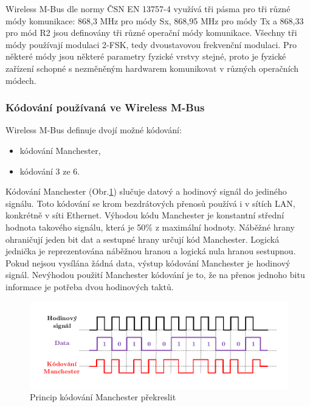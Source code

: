 Wireless M-Bus dle normy ČSN EN 13757-4 \cite{Norma4} využívá tři pásma pro tři různé módy komunikace: 868,3 MHz pro módy Sx, 868,95 MHz pro módy Tx a 868,33 pro mód R2 jsou definovány tři různé operační módy komunikace. Všechny tři módy používají modulaci 2-FSK, tedy dvoustavovou frekvenční modulaci. Pro některé módy jsou některé parametry fyzické vrstvy stejné, proto je fyzické zařízení schopné s nezměněným hardwarem komunikovat v různých operačních módech.


\subsubsection{Kódování používaná ve Wireless M-Bus}
Wireless M-Bus definuje dvojí možné kódování: 
\begin{itemize}
	\item kódování Manchester,
	\item kódování 3 ze 6. 
\end{itemize}

Kódování Manchester (Obr.\ref{ObrazekManechester}) slučuje datový a hodinový signál do jediného signálu. Toto kódování se krom bezdrátových přenosů používá i v sítích LAN, konkrétně v síti Ethernet. Výhodou kódu Manchester je konstantní střední hodnota takového signálu, která je 50\% z maximální hodnoty. Náběžné hrany ohraničují jeden bit dat a sestupné hrany určují kód Manchester. Logická jednička je reprezentována náběžnou hranou a logická nula hranou sestupnou. Pokud nejsou vysílána žádná data, výstup kódování Manchester je hodinový signál. Nevýhodou použití Manchester kódování je to, že na přenos jednoho bitu informace je potřeba dvou hodinových taktů.

				\begin{figure}[!ht]
 \begin{center}
    \includegraphics[scale=0.3]{obrazky/wmbus_manchester}
  \end{center}
  \caption{Princip kódování Manchester \cite{Manchester} \colorbox[rgb]{0,1,0}{překreslit}}
	\label{ObrazekManechester}
\end{figure}


